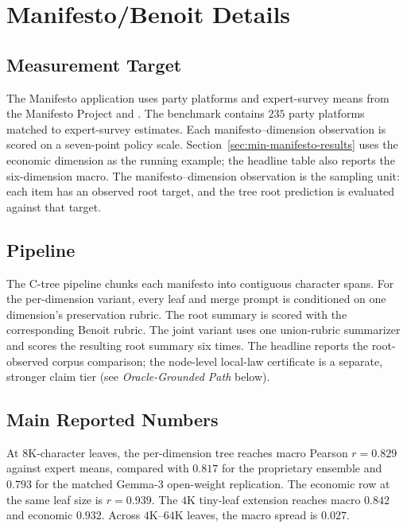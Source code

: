 \section{Manifesto/Benoit Details}\label{app:min-manifesto}

\subsection{Measurement Target}

The Manifesto application uses party platforms and expert-survey means
from the Manifesto Project and \citet{BenoitEtAl2025}. The benchmark
contains $235$ party platforms matched to expert-survey estimates. Each
manifesto--dimension observation is scored on a seven-point policy scale.
Section~\ref{sec:min-manifesto-results} uses the economic dimension as the
running example; the headline table also reports the six-dimension macro.
The manifesto--dimension observation is the sampling unit: each item has
an observed root target, and the tree root prediction is evaluated against
that target.

\subsection{Pipeline}

The C-tree pipeline chunks each manifesto into contiguous character spans.
For the per-dimension variant, every leaf and merge prompt is conditioned
on one dimension's preservation rubric. The root summary is scored with
the corresponding Benoit rubric. The joint variant uses one union-rubric
summarizer and scores the resulting root summary six times. The headline
reports the root-observed corpus comparison; the node-level local-law
certificate is a separate, stronger claim tier (see \emph{Oracle-Grounded
Path} below).

\subsection{Main Reported Numbers}

At $8\mathrm{K}$-character leaves, the per-dimension tree reaches macro
Pearson $r=0.829$ against expert means, compared with $0.817$ for the
proprietary ensemble and $0.793$ for the matched Gemma-3 open-weight
replication. The economic row at the same leaf size is $r=0.939$. The
$4\mathrm{K}$ tiny-leaf extension reaches macro $0.842$ and economic $0.932$.
Across $4\mathrm{K}$--$64\mathrm{K}$ leaves, the macro spread is $0.027$.

